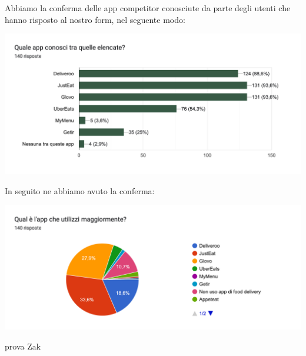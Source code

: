 \documentclass{article}
\begin{document}
Abbiamo la conferma delle app competitor conosciute da parte degli utenti che hanno risposto al nostro form, nel seguente modo:
\begin{center}
   \includegraphics[width=\textwidth]{Data/Grafici/App_competitor.png} 
\end{center}
\par In seguito ne abbiamo avuto la conferma:
\begin{center}
    \includegraphics[width=\textwidth]{Data/Grafici/App_competitor_utilizzate.png}
\end{center}

prova Zak

    \vspace{1cm}
\end{document}
